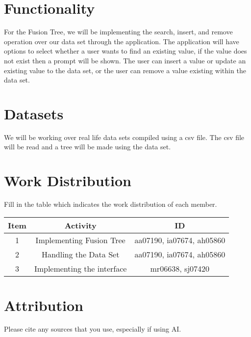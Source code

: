 \documentclass{article}
\begin{document}
\section{Functionality}
For the Fusion Tree, we will be implementing the search, insert, and remove operation over our data set through the application. The application will have options to select whether a user wants to find an existing value, if the value does not exist then a prompt will be shown. The user can insert a value or update an existing value to the data set, or the user can remove a value existing within the data set.

\section{Datasets}
We will be working over real life data sets compiled using a csv file. The csv file will be read and a tree will be made using the data set.

\section{Work Distribution}
Fill in the table which indicates the work distribution of each member.
\begin{center}
  \begin{table}[h]
    \centering
    \begin{tabular}{|c|c|c|}
      \hline
      Item & Activity   & ID      \\ \hline
      1    & Implementing Fusion Tree & aa07190, ia07674, ah05860 \\ \hline
      2    & Handling the Data Set & aa07190, ia07674, ah05860 \\ \hline
      3    & Implementing the interface & mr06638, sj07420 \\ \hline
    \end{tabular}

    \label{tab:my-table6}
  \end{table}
\end{center}

\section{Attribution}
Please cite any sources that you use, especially if using AI.
\end{document}

